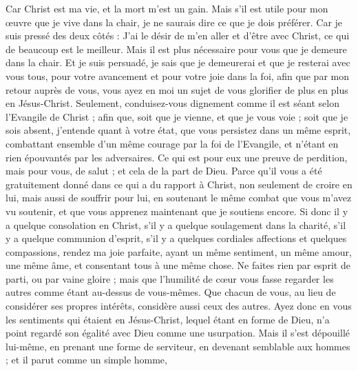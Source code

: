 \begin{multicols}{2}
Car Christ est ma vie, et la mort m’est un gain.
Mais s'il est utile pour mon œuvre que je vive dans la chair, je ne saurais dire ce que je dois préférer.
Car je suis pressé des deux côtés : J’ai le désir de m’en aller et d’être avec Christ, ce qui de beaucoup est le meilleur.
Mais il est plus nécessaire pour vous que je demeure dans la chair.
Et je suis persuadé, je sais que je demeurerai et que je resterai avec vous tous, pour votre avancement et pour votre joie dans la foi,
afin que par mon retour auprès de vous, vous ayez en moi un sujet de vous glorifier de plus en plus en Jésus-Christ.
Seulement, conduisez-vous dignement comme il est séant selon l'Evangile de Christ ; afin que, soit que je vienne, et que je vous voie ; soit que je sois absent, j'entende quant à votre état, que vous persistez dans un même esprit, combattant ensemble d'un même courage par la foi de l’Evangile, et n'étant en rien épouvantés par les adversaires.
Ce qui est pour eux une preuve de perdition, mais pour vous, de salut ; et cela de la part de Dieu.
Parce qu'il vous a été gratuitement donné dans ce qui a du rapport à Christ, non seulement de croire en lui, mais aussi de souffrir pour lui,
en soutenant le même combat que vous m’avez vu soutenir, et que vous apprenez maintenant que je soutiens encore.
\VerseOne{}Si donc il y a quelque consolation en Christ, s’il y a quelque soulagement dans la charité, s'il y a quelque communion d'esprit, s'il y a quelques cordiales affections et quelques compassions,
rendez ma joie parfaite, ayant un même sentiment, un même amour, une même âme, et consentant tous à une même chose.
Ne faites rien par esprit de parti, ou par vaine gloire ; mais que l’humilité de cœur vous fasse regarder les autres comme étant au-dessus de vous-mêmes.
Que chacun de vous, au lieu de considérer ses propres intérêts, considère aussi ceux des autres.
Ayez donc en vous les sentiments qui étaient en Jésus-Christ,
lequel étant en forme de Dieu, n'a point regardé son égalité avec Dieu comme une usurpation.
Mais il s’est dépouillé lui-même, en prenant une forme de serviteur, en devenant semblable aux hommes ; et il parut comme un simple homme,

\end{multicols}

